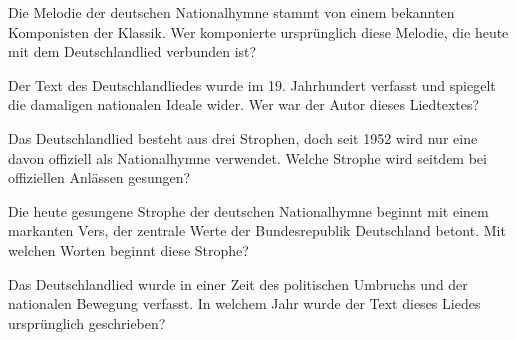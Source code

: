 \startSection
	
	\begin{question}{Die Melodie der deutschen Nationalhymne stammt von einem bekannten Komponisten der Klassik. Wer komponierte ursprünglich diese Melodie, die heute mit dem Deutschlandlied verbunden ist?}
	\end{question}

	
	\begin{question}{Der Text des Deutschlandliedes wurde im 19. Jahrhundert verfasst und spiegelt die damaligen nationalen Ideale wider. Wer war der Autor dieses Liedtextes?}
	\end{question}

	
	\begin{question}{Das Deutschlandlied besteht aus drei Strophen, doch seit 1952 wird nur eine davon offiziell als Nationalhymne verwendet. Welche Strophe wird seitdem bei offiziellen Anlässen gesungen?}
	\end{question}

	
	\begin{question}{Die heute gesungene Strophe der deutschen Nationalhymne beginnt mit einem markanten Vers, der zentrale Werte der Bundesrepublik Deutschland betont. Mit welchen Worten beginnt diese Strophe?}
	\end{question}

	
	\begin{question}{Das Deutschlandlied wurde in einer Zeit des politischen Umbruchs und der nationalen Bewegung verfasst. In welchem Jahr wurde der Text dieses Liedes ursprünglich geschrieben?}
	\end{question}
\renderSection
